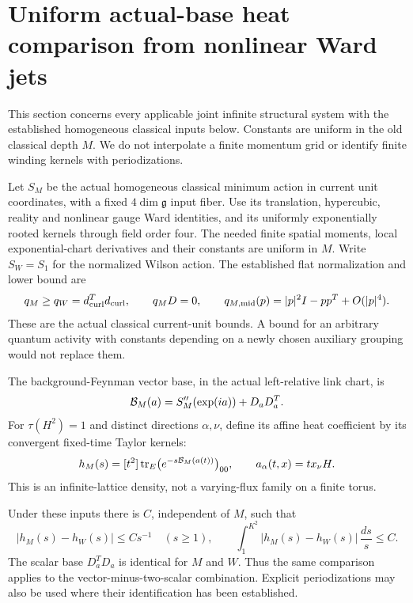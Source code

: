 \section{Uniform actual-base heat comparison from nonlinear Ward jets}
\label{abw-section}

This section concerns every applicable joint infinite structural system
with the established homogeneous classical inputs below. Constants are
uniform in the old classical depth \(M\). We do not interpolate a finite
momentum grid or identify finite winding kernels with periodizations.

Let \(S_M\) be the actual homogeneous classical minimum action in current
unit coordinates, with a fixed \(4\dim\mathfrak g\) input fiber.
Use its translation, hypercubic, reality and nonlinear gauge Ward
identities, and its uniformly exponentially rooted kernels through field
order four. The needed finite spatial moments, local exponential-chart
derivatives and their constants are uniform in \(M\).
Write \(S_W=S_1\) for the normalized Wilson action. The established flat
normalization and lower bound are
\begin{equation}
 q_M\ge q_W=d_{\rm curl}^{T}d_{\rm curl},\qquad q_MD=0,\qquad
 q_{M,\mathrm{mid}}(p)=|p|^2I-pp^T+O(|p|^4).
 \label{abw-input}
\end{equation}
These are the actual classical current-unit bounds. A bound for an
arbitrary quantum activity with constants depending on a newly chosen
auxiliary grouping would not replace them.

The background-Feynman vector base, in the actual left-relative link
chart, is
\[
 {\cal B}_M(a)=S_M''(\exp(ia))+D_aD_a^T.
\]
For \(\tau(H^2)=1\) and distinct directions \(\alpha,\nu\), define its
affine heat coefficient by its convergent fixed-time Taylor kernels:
\begin{equation}
 h_M(s)=[t^2]\operatorname{tr}_{E}
 \bigl(e^{-s{\cal B}_M(a(t))}\bigr)_{00},\qquad
 a_\alpha(t,x)=t x_\nu H.
 \label{abw-h}
\end{equation}
This is an infinite-lattice density, not a varying-flux family on a
finite torus.

\begin{theorem}
\label{abw-main}
Under these inputs there is \(C\), independent of \(M\), such that
\begin{equation}
 |h_M(s)-h_W(s)|\le C s^{-1}\quad(s\ge1),\qquad
 \int_1^{K^2}|h_M(s)-h_W(s)|\,\frac{ds}{s}\le C.
 \label{abw-bound}
\end{equation}
The scalar base \(D_a^TD_a\) is identical for \(M\) and \(W\).
Thus the same comparison applies to the vector-minus-two-scalar
combination. Explicit periodizations may also be used where their
identification has been established.
\end{theorem}

